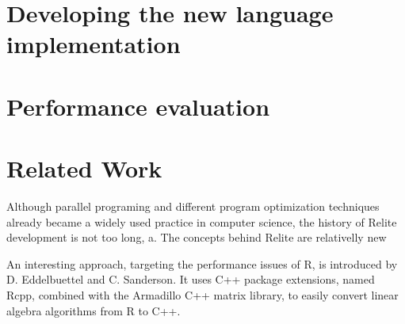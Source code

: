 \documentclass{sigplanconf}
\begin{document}
\section{Developing the new language implementation}

\section{Performance evaluation}






\section{Related Work}
Although parallel programing and different program optimization techniques already became a widely used practice in computer science, the history of Relite development is not too long, a. The concepts
behind Relite are relativelly new

An interesting approach, targeting the performance issues of R, is introduced by D. Eddelbuettel and C. Sanderson. It uses C++ package extensions, named Rcpp, combined with the Armadillo C++ matrix library, to easily convert linear 
algebra algorithms from R to C++.
\end{document}

